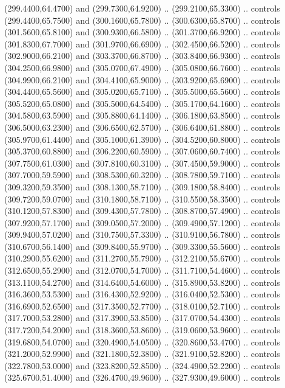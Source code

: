 {\begin{scope}[y=0.80pt, x=0.80pt, yscale=-1, xscale=1, inner sep=0pt, outer sep=0pt, #1]
      (299.4400,64.4700) and (299.7300,64.9200) .. (299.2100,65.3300) .. controls
      (299.4400,65.7500) and (300.1600,65.7800) .. (300.6300,65.8700) .. controls
      (301.5600,65.8100) and (300.9300,66.5800) .. (301.3700,66.9200) .. controls
      (301.8300,67.7000) and (301.9700,66.6900) .. (302.4500,66.5200) .. controls
      (302.9000,66.2100) and (303.3700,66.8700) .. (303.8400,66.9300) .. controls
      (304.2500,66.9800) and (305.0700,67.4900) .. (305.0800,66.7600) .. controls
      (304.9900,66.2100) and (304.4100,65.9000) .. (303.9200,65.6900) .. controls
      (304.4400,65.5600) and (305.0200,65.7100) .. (305.5000,65.5600) .. controls
      (305.5200,65.0800) and (305.5000,64.5400) .. (305.1700,64.1600) .. controls
      (304.5800,63.5900) and (305.8800,64.1400) .. (306.1800,63.8500) .. controls
      (306.5000,63.2300) and (306.6500,62.5700) .. (306.6400,61.8800) .. controls
      (305.9700,61.4400) and (305.1000,61.3900) .. (304.5200,60.8000) .. controls
      (305.3700,60.8800) and (306.2200,60.5900) .. (307.0600,60.7400) .. controls
      (307.7500,61.0300) and (307.8100,60.3100) .. (307.4500,59.9000) .. controls
      (307.7000,59.5900) and (308.5300,60.3200) .. (308.7800,59.7100) .. controls
      (309.3200,59.3500) and (308.1300,58.7100) .. (309.1800,58.8400) .. controls
      (309.7200,59.0700) and (310.1800,58.7100) .. (310.5500,58.3500) .. controls
      (310.1200,57.8300) and (309.4300,57.7800) .. (308.8700,57.4900) .. controls
      (307.9200,57.1700) and (309.0500,57.2000) .. (309.4900,57.1200) .. controls
      (309.9400,57.0200) and (310.7500,57.3300) .. (310.9100,56.7800) .. controls
      (310.6700,56.1400) and (309.8400,55.9700) .. (309.3300,55.5600) .. controls
      (310.2900,55.6200) and (311.2700,55.7900) .. (312.2100,55.6700) .. controls
      (312.6500,55.2900) and (312.0700,54.7000) .. (311.7100,54.4600) .. controls
      (313.1100,54.2700) and (314.6400,54.6000) .. (315.8900,53.8200) .. controls
      (316.3600,53.5300) and (316.4300,52.9200) .. (316.0400,52.5300) .. controls
      (316.6900,52.6500) and (317.3500,52.7700) .. (318.0100,52.7100) .. controls
      (317.7000,53.2800) and (317.3900,53.8500) .. (317.0700,54.4300) .. controls
      (317.7200,54.2000) and (318.3600,53.8600) .. (319.0600,53.9600) .. controls
      (319.6800,54.0700) and (320.4900,54.0500) .. (320.8600,53.4700) .. controls
      (321.2000,52.9900) and (321.1800,52.3800) .. (321.9100,52.8200) .. controls
      (322.7800,53.0000) and (323.8200,52.8500) .. (324.4900,52.2200) .. controls
      (325.6700,51.4000) and (326.4700,49.9600) .. (327.9300,49.6000) .. controls

\end{scope}}
